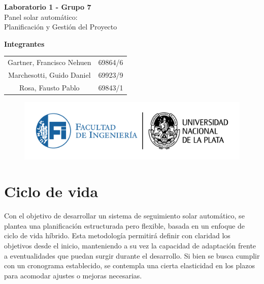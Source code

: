 \documentclass[a4paper,12pt]{article}
\begin{document}
\begin{titlepage}
    \begin{center}
        \vspace*{3cm}
        
        {\Huge \textbf{Laboratorio 1 - Grupo 7}}\\[1cm]
        {\LARGE Panel solar automático:\\ [0.5cm]Planificación y Gestión del Proyecto}\\[2cm]
        
        \vfill
        
        {\Large \textbf{Integrantes}}\\[.5cm]
        \large
        \begin{tabular}{c c}
            Gartner, Francisco Nehuen & 69864/6 \\
            Marchesotti, Guido Daniel & 69923/9 \\
            Rosa, Fausto Pablo & 69843/1 \\
        \end{tabular}
        
        \vspace{1cm}
        
        \begin{figure}[b]
            \centering
            \includegraphics[width=1\linewidth]{LOGOSFI-UNLP-color-01.png}
        \end{figure}
        
    \end{center}
\end{titlepage}

\newpage
\section{Ciclo de vida}

Con el objetivo de desarrollar un sistema de seguimiento solar automático, se plantea una planificación estructurada pero flexible, basada en un enfoque de ciclo de vida híbrido. Esta metodología permitirá definir con claridad los objetivos desde el inicio, manteniendo a su vez la capacidad de adaptación frente a eventualidades que puedan surgir durante el desarrollo. Si bien se busca cumplir con un cronograma establecido, se contempla una cierta elasticidad en los plazos para acomodar ajustes o mejoras necesarias.
\end{document}
